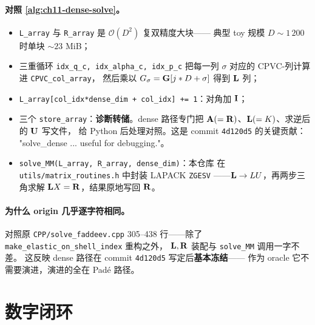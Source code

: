 \paragraph{对照 \cref{alg:ch11-dense-solve}。}
\begin{itemize}
  \item \texttt{L\_array} 与 \texttt{R\_array} 是
        \(\mathcal{O}(D^2)\) 复双精度大块——
        典型 toy 规模 \(D \sim 1\,200\) 时单块 \(\sim 23\) MiB；
  \item 三重循环 \texttt{idx\_q\_c, idx\_alpha\_c, idx\_p\_c}
        把每一列 \(\sigma\) 对应的 CPVC-列计算进 \texttt{CPVC\_col\_array}，
        然后乘以 \(G_\sigma = \mathbf{G}[j*D + \sigma]\) 得到 \(\mathbf{L}\) 列；
  \item \texttt{L\_array[col\_idx*dense\_dim + col\_idx] += 1}：对角加 \(\mathbf{I}\)；
  \item 三个 \texttt{store\_array}：\textbf{诊断转储}。dense 路径专门把
        \(\mathbf{A} (= \mathbf{R})\)、\(\mathbf{L} (= K)\)、求逆后的 \(\mathbf{U}\) 写文件，
        给 Python 后处理对照。这是 commit \texttt{4d120d5} 的关键贡献：
        "solve\_dense ... useful for debugging."。
  \item \texttt{solve\_MM(L\_array, R\_array, dense\_dim)}：本仓库
        在 \texttt{utils/matrix\_routines.h} 中封装 LAPACK \texttt{ZGESV}
        ——\(\mathbf{L} \to LU\)，再两步三角求解 \(\mathbf{L} X = \mathbf{R}\)，结果原地写回 \(\mathbf{R}\)。
\end{itemize}

\paragraph{为什么 origin 几乎逐字符相同。}
对照原 \texttt{CPP/solve\_faddeev.cpp} 305--438 行——除了
\texttt{make\_elastic\_on\_shell\_index} 重构之外，
\(\mathbf{L}, \mathbf{R}\) 装配与 \texttt{solve\_MM} 调用一字不差。
这反映 dense 路径在 commit \texttt{4d120d5} 写定后\textbf{基本冻结}——
作为 oracle 它不需要演进，演进的全在 Padé 路径。

\section{数字闭环}
\label{sec:ch11-numerical}

